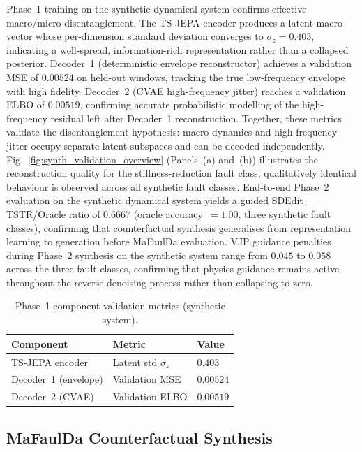 \documentclass[conference]{IEEEtran}
\begin{document}
Phase~1 training on the synthetic dynamical system confirms effective macro/micro disentanglement.
The TS-JEPA encoder produces a latent macro-vector whose per-dimension standard deviation converges to
$\sigma_{z} = 0.403$, indicating a well-spread, information-rich representation rather than a collapsed
posterior.
Decoder~1 (deterministic envelope reconstructor) achieves a validation MSE of $0.00524$ on held-out
windows, tracking the true low-frequency envelope with high fidelity.
Decoder~2 (CVAE high-frequency jitter) reaches a validation ELBO of $0.00519$, confirming accurate
probabilistic modelling of the high-frequency residual left after Decoder~1 reconstruction.
Together, these metrics validate the disentanglement hypothesis: macro-dynamics and high-frequency jitter
occupy separate latent subspaces and can be decoded independently.
Fig.~\ref{fig:synth_validation_overview} (Panels~(a) and~(b)) illustrates the reconstruction quality
for the stiffness-reduction fault class; qualitatively identical behaviour is observed across all
synthetic fault classes.
End-to-end Phase~2 evaluation on the synthetic dynamical system yields a guided SDEdit TSTR/Oracle ratio of $0.6667$ (oracle accuracy~$= 1.00$, three synthetic fault classes), confirming that counterfactual synthesis generalises from representation learning to generation before MaFaulDa evaluation.
VJP guidance penalties during Phase~2 synthesis on the synthetic system range from $0.045$ to $0.058$ across the three fault classes, confirming that physics guidance remains active throughout the reverse denoising process rather than collapsing to zero.

\begin{table}[h]
\caption{Phase~1 component validation metrics (synthetic system).}
\label{tab:phase1}
\centering\small
\begin{tabular}{lll}
\toprule
Component & Metric & Value \\
\midrule
TS-JEPA encoder      & Latent std $\sigma_z$   & $0.403$ \\
Decoder~1 (envelope) & Validation MSE          & $0.00524$ \\
Decoder~2 (CVAE)     & Validation ELBO         & $0.00519$ \\
\bottomrule
\end{tabular}
\end{table}

\subsection{MaFaulDa Counterfactual Synthesis}
\end{document}
